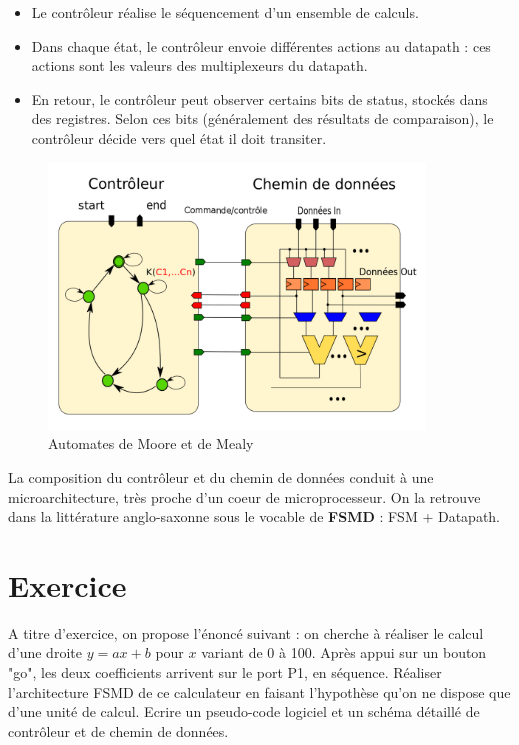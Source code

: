 \begin{itemize}
  \item Le contrôleur réalise le séquencement d'un ensemble de calculs.
  \item Dans chaque état, le contrôleur envoie différentes actions au datapath : ces actions sont les valeurs des multiplexeurs du datapath.
  \item En retour, le contrôleur peut observer certains bits de status, stockés dans des registres. Selon ces bits (généralement des résultats de comparaison),
  le contrôleur décide vers quel état il doit transiter.
\end{itemize}

\begin{figure}[h!]
  \centering
   \includegraphics[width=10cm]{./figures/FSMD-2.png}
  \caption{Automates de Moore et de Mealy}
  \label{fig:fsmd2}
\end{figure}

La composition du contrôleur et du chemin de données conduit à une microarchitecture, très proche d'un coeur de microprocesseur. On la retrouve dans la littérature
anglo-saxonne sous le vocable de {\bf FSMD} : FSM + Datapath.

\section{Exercice}
A titre d'exercice, on propose l'énoncé suivant : on cherche à réaliser le calcul d'une droite $y=ax+b$ pour $x$ variant de 0 à 100.
Après appui sur un bouton "go", les deux coefficients arrivent sur le port P1, en séquence. Réaliser l'architecture FSMD de ce calculateur en faisant l'hypothèse
qu'on ne dispose que d'une unité de calcul. Ecrire un pseudo-code logiciel et un schéma détaillé de contrôleur et de chemin de données.

